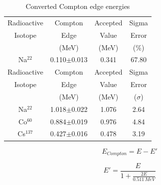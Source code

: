 \documentclass[aps,prl,twocolumn,superscriptaddress,nofootinbib]{revtex4-1}
\begin{document}
\vfill\eject




\begin{table}[h!] 
\caption{Converted Compton edge energies}
 \begin{center}   %
    \begin{tabular}{|c|c|c|c|} \hline   %
Radioactive  & Compton  & Accepted     & Sigma \\
Isotope   &     Edge &  Value & Error \\
      &  (MeV)    & (MeV)   & (\%) \\ \hline \hline
Na$^{22}$      & 0.110$\pm$0.013 & 0.341 & 67.80 \\ \hline\hline\hline
Radioactive  & Compton  & Accepted     & Sigma \\
Isotope   &     Edge &  Value & Error \\
      &  (MeV)    & (MeV)   & ($\sigma$) \\ \hline \hline
Na$^{22}$      & 1.018$\pm$0.022 & 1.076 & 2.64 \\ \hline
Co$^{60}$      & 0.884$\pm$0.019  & 0.976 & 4.84 \\ \hline
Cs$^{137}$     & 0.427$\pm$0.016 & 0.478 & 3.19 \\ \hline
     \end{tabular}
  \end{center}
  \label{tab1}
\end{table}




\begin{equation}
E_{Compton}=E-E'
\end{equation}

\begin{equation}
E'=\frac{E}{1+\frac{2E}{0.511\,MeV}}
\end{equation}
\end{document}

